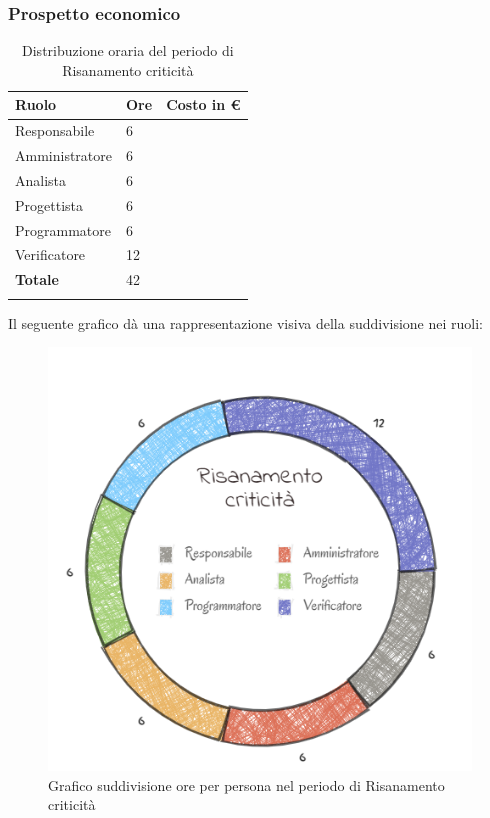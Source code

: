 \subsubsection{Prospetto economico}
\begin{longtable}{| C{.30\textwidth}| C{.15\textwidth}| C{.20\textwidth}|}
\hline
\textbf{Ruolo} & \textbf{Ore} & \textbf{Costo in \euro} \\
\hline 
Responsabile & 6 &  \\
\hline
Amministratore & 6 &  \\
\hline
Analista & 6 &  \\
\hline
Progettista & 6 & \\
\hline
Programmatore & 6 &  \\
\hline 
Verificatore & 12 &  \\
\hline
\textbf{Totale} & 42 &  \\
\hline 

\caption{Distribuzione oraria del periodo di Risanamento criticità}
\label{Distribuzione oraria del periodo di Risanamento criticità}
\end{longtable}

Il seguente grafico dà una rappresentazione visiva della suddivisione nei ruoli:
\begin{figure}[H]
	\centering
  		\includegraphics[width=0.8\linewidth]{./images/torta_rc2.png}
  		\caption{Grafico suddivisione ore per persona nel periodo di Risanamento criticità}
  		\label{fig:grafico suddivione ruoli periodo di Risanamento criticità}
\end{figure}

